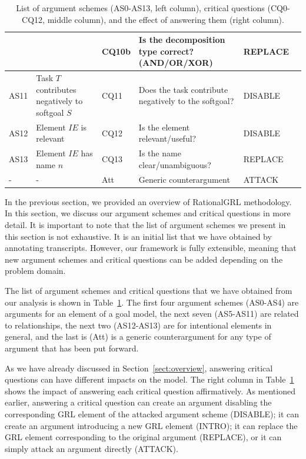 \begin{table}[h]
\begin{tabularx}{\textwidth}{|l|l|l|X|l|l|}
 &  & CQ10b & Is the decomposition type correct? (AND/OR/XOR)& REPLACE\\
\hline
AS11 & Task $T$ contributes negatively to softgoal $S$& CQ11 & Does the task contribute negatively to the softgoal?& DISABLE\\
\hline
\hline
AS12 & Element $IE$ is relevant & CQ12 & Is the element relevant/useful? & DISABLE\\
\hline
AS13 & Element $IE$ has name $n$ & CQ13 & Is the name clear/unambiguous? & REPLACE\\
\hline
\hline
- & - & Att & Generic counterargument & ATTACK\\
\hline
\end{tabularx}
\caption{List of argument schemes (AS0-AS13, left column), critical questions (CQ0-CQ12, middle column), and the effect of answering them (right column).}
\label{table:argument-schemes}
\end{table}

In the previous section, we provided an overview of RationalGRL methodology. In this section, we discuss our argument schemes and critical questions in more detail. It is important to note that the list of argument schemes we present in this section is not exhaustive. It is an initial list that we have obtained by annotating transcripts. However, our framework is fully extensible, meaning that new argument schemes and critical questions can be added depending on the problem domain.

The list of argument schemes and critical questions that we have obtained from our analysis is shown in Table~\ref{table:argument-schemes}. The first four argument schemes (AS0-AS4) are arguments for an element of a goal model, the next seven (AS5-AS11) are related to relationships, the next two (AS12-AS13) are for intentional elements in general, and the last is (Att) is a generic counterargument for any type of argument that has been put forward.

As we have already discussed in Section~\ref{sect:overview}, answering critical questions can have different impacts on the model. The right column in Table~\ref{table:argument-schemes} shows the impact of answering each critical question affirmatively. %
As mentioned earlier, answering a critical question can create an argument disabling the corresponding GRL element of the attacked argument scheme (\textsf{DISABLE}); it can create an argument introducing a new GRL element (\textsf{INTRO}); it can replace the GRL element corresponding to the original argument (\textsf{REPLACE}), or it can simply attack an argument directly (\textsf{ATTACK}).

